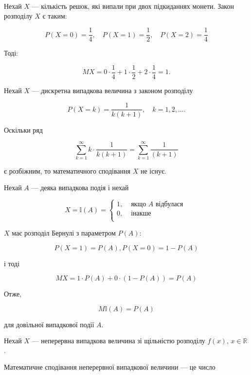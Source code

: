 \begin{example}
    Нехай $X$ --- кількість решок, які випали при двох підкиданнях
    монети.
    Закон розподілу $X$ є таким:

    $$P(X=0) = \frac{1}{4},
    \quad P(X=1) = \frac{1}{2},
    \quad P(X=2) = \frac{1}{4}$$
    
    Тоді: 

    $$MX = 0 \cdot \frac{1}{4} + 1 \cdot \frac{1}{2} + 2 \cdot \frac{1}{4} = 1.$$
\end{example}

\begin{example}
    Нехай $X$ --- дискретна випадкова величина з законом розподілу

    $$P(X=k) = \frac{1}{k(k+1)}, \quad k = 1, 2, ....$$
    
    Оскільки ряд 

    $$\sum\limits_{k=1}^{\infty} k \cdot \frac{1}{k(k+1)}
    = \sum\limits_{k=1}^{\infty} \frac{1}{(k+1)}$$
    
    є розбіжним, то математичного сподівання $X$ не існує.
\end{example}

\begin{example}
    Нехай $A$ --- деяка випадкова подія і нехай

    $$X = \mathbb{I}(A) = \left\{ \begin{array}{ll}
        1, & \text{ якщо } A \text{ відбулася } \\
        0, & \text{ інакше } \\
    \end{array} \right.$$

    $X$ має розподіл Бернулі з параметром $P(A)$:

    $$P(X=1) = P(A), P(X=0) = 1 - P(A)$$

    і тоді

    $$MX = 1 \cdot P(A) + 0 \cdot (1 - P(A)) = P(A)$$

    Отже, 

    \begin{equation}
        M \mathbb{I}(A) = P(A)
    \end{equation}

    для довільної випадкової події $A$.
\end{example}

Нехай $X$ --- неперервна випадкова величина
зі щільністю розподілу $f(x)$, $x \in \mathbb{R}$.

Математичне сподівання неперервної випадкової
величини --- це число

